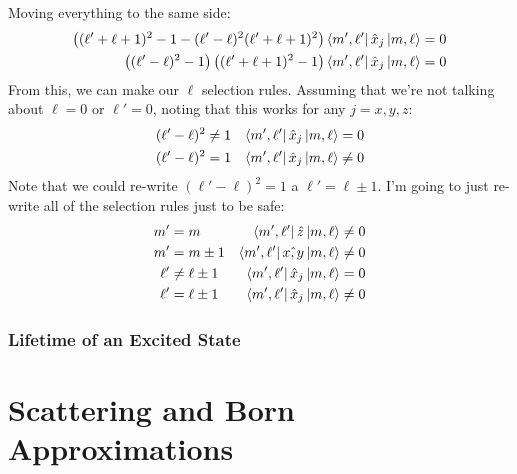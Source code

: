 \documentclass[a4paper]{article}
\begin{document}
Moving everything to the same side:
\begin{align*}
	\left((\ell'+\ell+1)^2-1-(\ell'-\ell)^2(\ell'+\ell+1)^2\right)
	\left\langle m',\ell' \right\rvert\hat{x}_j\left\lvert m,\ell\right\rangle &= 0\\
	\left((\ell'-\ell)^2-1\right)\left((\ell'+\ell+1)^2-1\right)
	\left\langle m',\ell' \right\rvert\hat{x}_j\left\lvert m,\ell\right\rangle &= 0
\end{align*}
From this, we can make our $\ell$ selection rules. Assuming that we're not
talking about $\ell=0$ or $\ell'=0$, noting that this works for any $j=x,y,z$:
\begin{align*}
	(\ell'-\ell)^2 &\neq 1 &  \left\langle m',\ell' \right\rvert\hat{x}_j\left\lvert m,\ell\right\rangle &= 0\\
	(\ell'-\ell)^2 &= 1 &  \left\langle m',\ell' \right\rvert\hat{x}_j\left\lvert m,\ell\right\rangle &\neq 0
\end{align*}
Note that we could re-write $(\ell'-\ell)^2 = 1$ a $\ell' = \ell \pm 1$.
I'm going to just re-write all of the selection rules just to be safe:
\begin{align*}
	m' &= m & \left\langle m',\ell' \right\rvert\hat{z}\left\lvert m,\ell\right\rangle &\neq 0\\
	m' &= m \pm 1 & \left\langle m',\ell' \right\rvert\hat{x,y}\left\lvert m,\ell\right\rangle &\neq 0\\
	\ell' &\neq \ell \pm 1 &  \left\langle m',\ell' \right\rvert\hat{x}_j\left\lvert m,\ell\right\rangle &= 0\\
	\ell' &= \ell \pm 1 &  \left\langle m',\ell' \right\rvert\hat{x}_j\left\lvert m,\ell\right\rangle &\neq 0
\end{align*}




\subsubsection{Lifetime of an Excited State}

\section{Scattering and Born Approximations}
\end{document}
